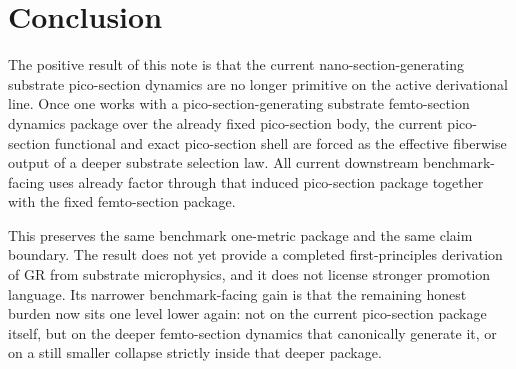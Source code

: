 \documentclass[11pt]{article}
\begin{document}
\section{Conclusion}

The positive result of this note is that the current nano-section-generating substrate pico-section dynamics are no longer primitive on the active derivational line. Once one works with a pico-section-generating substrate femto-section dynamics package over the already fixed pico-section body, the current pico-section functional and exact pico-section shell are forced as the effective fiberwise output of a deeper substrate selection law. All current downstream benchmark-facing uses already factor through that induced pico-section package together with the fixed femto-section package.

This preserves the same benchmark one-metric package and the same claim boundary. The result does not yet provide a completed first-principles derivation of GR from substrate microphysics, and it does not license stronger promotion language. Its narrower benchmark-facing gain is that the remaining honest burden now sits one level lower again: not on the current pico-section package itself, but on the deeper femto-section dynamics that canonically generate it, or on a still smaller collapse strictly inside that deeper package.
\end{document}
